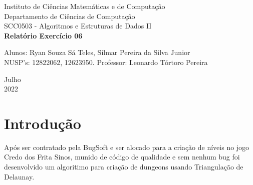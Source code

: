 \documentclass[a4paper, 12pt]{article}
\begin{document}

\begin{titlepage}
	\begin{center}
	

		\Huge{Instituto de Ciências Matemáticas e de Computação}\\
		\large{Departamento de Ciências de Computação}\\ 
		\large{SCC0503 - Algoritmos e Estruturas de Dados II}\\ 
		\vspace{15pt}
        \vspace{95pt}
        \textbf{\LARGE{Relatório Exercício 06}}\\
		\vspace{3,5cm}
	\end{center}
	
	\begin{flushleft}
		\begin{tabbing}
			Alunos: Ryan Souza Sá Teles, Silmar Pereira da Silva Junior \\
            NUSP's: 12822062, 12623950.
			Professor: Leonardo Tórtoro Pereira\\
	\end{tabbing}
 \end{flushleft}
	\vspace{1cm}
	
	\begin{center}
		\vspace{\fill}
			 Julho\\
		 2022
			\end{center}
\end{titlepage}

\newpage
\newpage
\tableofcontents
\thispagestyle{empty}

\newpage
{}
\section{Introdução}
Após ser contratado pela BugSoft e ser alocado para a criação de níveis no jogo Credo dos Frita Sinos, munido de código de qualidade e sem nenhum bug foi desenvolvido um algoritimo para  criação de dungeons usando Triangulação de Delaunay.
\end{document}
